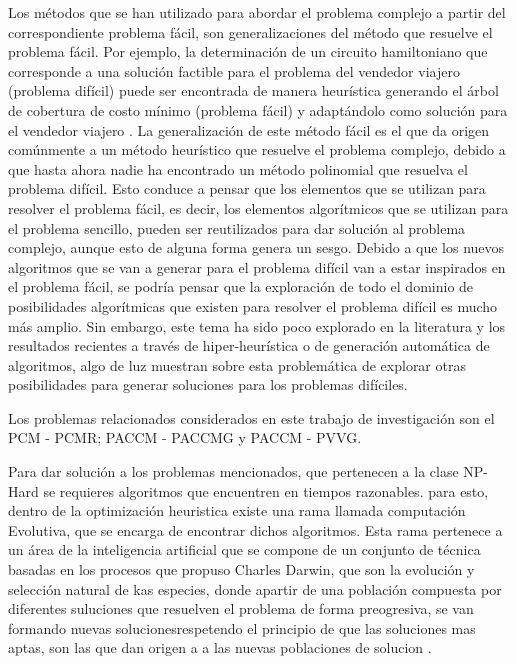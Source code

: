   Los métodos que se han utilizado para abordar el problema complejo a partir del correspondiente problema fácil, son generalizaciones del método que resuelve el problema fácil. Por ejemplo, la determinación de un circuito hamiltoniano que corresponde a una solución factible para el problema del vendedor viajero (problema difícil) puede ser encontrada de manera heurística generando el árbol de cobertura de costo mínimo (problema fácil) y adaptándolo como solución para el vendedor viajero \citep{Applegate09}. La generalización de este método fácil es el que da origen comúnmente a un método heurístico que resuelve el problema complejo, debido a que hasta ahora nadie ha encontrado un método polinomial que resuelva el problema difícil. Esto conduce a pensar que los elementos que se utilizan para resolver el problema fácil, es decir, los elementos algorítmicos que se utilizan para el problema sencillo, pueden ser reutilizados para dar solución al problema complejo, aunque esto de alguna forma genera un sesgo. Debido a que los nuevos algoritmos que se van a generar para el problema difícil van a estar inspirados en el problema fácil, se podría pensar que la exploración de todo el dominio de posibilidades algorítmicas que existen para resolver el problema difícil es mucho más amplio. Sin embargo, este tema ha sido poco explorado en la literatura y los resultados recientes a través de hiper-heurística o de generación automática de algoritmos, algo de luz muestran sobre esta problemática de explorar otras posibilidades para generar soluciones para los problemas difíciles.


Los problemas relacionados considerados en este trabajo de investigación son el PCM - PCMR; PACCM - PACCMG y PACCM - PVVG. 

Para dar solución a los problemas mencionados, que pertenecen a la clase NP-Hard se requieres algoritmos que encuentren en tiempos razonables. para esto, dentro de la optimización heuristica existe una rama llamada computación Evolutiva, que se encarga de encontrar dichos algoritmos. Esta rama pertenece a un área de la inteligencia artificial que se compone de un conjunto de técnica basadas en los procesos que propuso Charles Darwin, que son la evolución y selección natural de kas especies, donde apartir de una población compuesta por diferentes suluciones que resuelven el problema de forma preogresiva, se van formando nuevas solucionesrespetendo el principio de que las soluciones mas aptas, son las que dan origen a a las nuevas poblaciones de solucion \citep{koza1999genetic}. 

